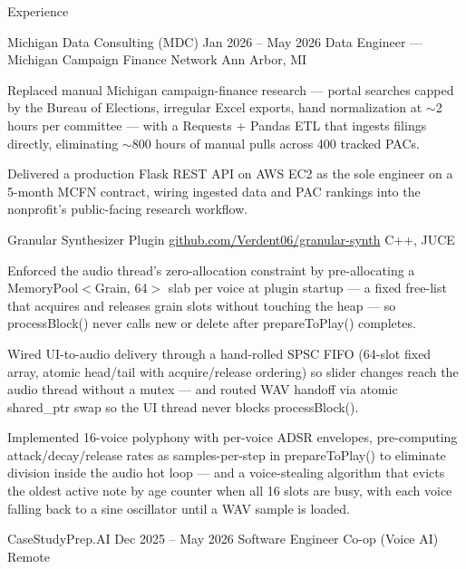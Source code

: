 \documentclass[
	11pt
]{../../../template}
\begin{document}
	\begin{rSection}{E}{xperience}
		\begin{rSectionEntry}
			{Michigan Data Consulting (MDC)}
			{Jan 2026 -- May 2026}
			{Data Engineer --- Michigan Campaign Finance Network}
			{}
			{Ann Arbor, MI}

			\item Replaced manual Michigan campaign-finance research --- portal searches capped by the Bureau of Elections, irregular Excel exports, hand normalization at $\sim$2 hours per committee --- with a Requests + Pandas ETL that ingests filings directly, eliminating $\sim$800 hours of manual pulls across 400 tracked PACs.
			\item Delivered a production Flask REST API on AWS EC2 as the sole engineer on a 5-month MCFN contract, wiring ingested data and PAC rankings into the nonprofit's public-facing research workflow.
		\end{rSectionEntry}

		\begin{rSectionEntry}
			{Granular Synthesizer Plugin}
			{\href{https://github.com/Verdent06/granular-synth}{github.com/Verdent06/granular-synth}}
			{}
			{C++, JUCE}
			{}

			\item Enforced the audio thread's zero-allocation constraint by pre-allocating a MemoryPool$<$Grain, 64$>$ slab per voice at plugin startup --- a fixed free-list that acquires and releases grain slots without touching the heap --- so processBlock() never calls new or delete after prepareToPlay() completes.
			\item Wired UI-to-audio delivery through a hand-rolled SPSC FIFO (64-slot fixed array, atomic head/tail with acquire/release ordering) so slider changes reach the audio thread without a mutex --- and routed WAV handoff via atomic shared\_ptr swap so the UI thread never blocks processBlock().
			\item Implemented 16-voice polyphony with per-voice ADSR envelopes, pre-computing attack/decay/release rates as samples-per-step in prepareToPlay() to eliminate division inside the audio hot loop --- and a voice-stealing algorithm that evicts the oldest active note by age counter when all 16 slots are busy, with each voice falling back to a sine oscillator until a WAV sample is loaded.
		\end{rSectionEntry}

		\begin{rSectionEntry}
			{CaseStudyPrep.AI}
			{Dec 2025 -- May 2026}
			{Software Engineer Co-op (Voice AI)}
			{}
			{Remote}


\end{rSectionEntry}
\end{rSection}
\end{document}
